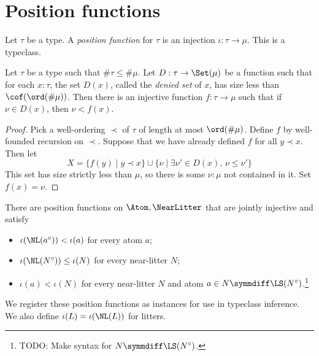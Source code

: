 \section{Position functions}
\begin{definition}
  \label{def:Position}
  \leanok
  Let \( \tau \) be a type.
  A \emph{position function} for \( \tau \) is an injection \( \iota : \tau \to \mu \).
  This is a typeclass.
\end{definition}
\begin{proposition}
  \label{prop:funOfDeny}
  \leanok
  Let \( \tau \) be a type such that \( \#\tau \leq \#\mu \).
  Let \( D : \tau \to \Set(\mu) \) be a function such that for each \( x : \tau \), the set \( D(x) \), called the \emph{denied set} of \( x \), has size less than \( \cof(\ord(\#\mu)) \).
  Then there is an injective function \( f : \tau \to \mu \) such that if \( \nu \in D(x) \), then \( \nu < f(x) \).
\end{proposition}
\begin{proof}
  \leanok
  Pick a well-ordering \( \prec \) of \( \tau \) of length at most \( \ord(\#\mu) \).
  Define \( f \) by well-founded recursion on \( \prec \).
  Suppose that we have already defined \( f \) for all \( y \prec x \).
  Then let
  \[ X = \{ f(y) \mid y \prec x \} \cup \{ \nu \mid \exists \nu' \in D(x),\, \nu \leq \nu' \} \]
  This set has size strictly less than \( \mu \), so there is some \( \nu : \mu \) not contained in it.
  Set \( f(x) = \nu \).
\end{proof}
\begin{proposition}
  \label{prop:BasePositions}
  \leanok
  There are position functions on \( \Atom, \NearLitter \) that are jointly injective and satisfy
  \begin{itemize}
    \item \( \iota(\NL(a^\circ)) < \iota(a) \) for every atom \( a \);
    \item \( \iota(\NL(N^\circ)) \leq \iota(N) \) for every near-litter \( N \);
    \item \( \iota(a) < \iota(N) \) for every near-litter \( N \) and atom \( a \in N \symmdiff \LS(N^\circ) \).\footnote{TODO: Make syntax for \( N \symmdiff \LS(N^\circ) \).}
  \end{itemize}
  We register these position functions as instances for use in typeclass inference.
  We also define \( \iota(L) = \iota(\NL(L)) \) for litters.
\end{proposition}
